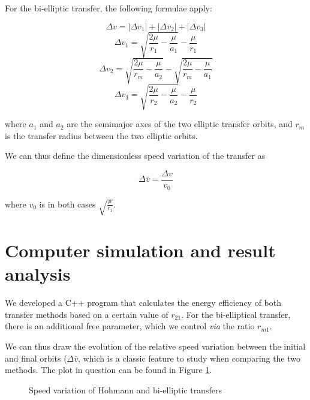 \documentclass[journal]{IEEEtran}
\begin{document}
For the bi-elliptic transfer, the following formulae apply:

\begin{equation}
    \Delta v  = \left|\Delta v_1 \right| + \left| \Delta v_2 \right| + \left| \Delta v_3 \right|
\end{equation}
\begin{equation}
    \Delta v_1 = \sqrt{\frac{2\mu}{r_1}-\frac{\mu}{a_1}}-\frac{\mu}{r_1}
\end{equation}
\begin{equation}
    \Delta v_2 = \sqrt{\frac{2\mu}{r_m}-\frac{\mu}{a_2}} - \sqrt{\frac{2\mu}{r_m}-\frac{\mu}{a_1}}
\end{equation}
\begin{equation}
    \Delta v_3 = \sqrt{\frac{2\mu}{r_2}-\frac{\mu}{a_2}}-\frac{\mu}{r_2}
\end{equation}

where $a_1$ and $a_2$ are the semimajor axes of the two elliptic transfer orbits, and $r_m$ is the transfer radius between the two elliptic orbits.

We can thus define the dimensionless speed variation of the transfer as

\begin{equation}
    \Delta \bar{v} = \frac{\Delta v}{v_0}
\end{equation}

where $v_0$ is in both cases $\sqrt{\frac{\mu}{r_1}}$.

\section*{Computer simulation and result analysis}

We developed a C++ program\cite{git_program} that calculates the energy efficiency of both transfer methods based on a certain value of $r_{21}$. For the bi-elliptical transfer, there is an additional free parameter, which we control \textit{via} the ratio $r_{m1}$.

We can thus draw the evolution of the relative speed variation between the initial and final orbits ($\Delta \bar{v}$, which is a classic feature to study when comparing the two methods. The plot in question can be found in Figure \ref{plot:vbar}.


\begin{figure}[htp!]
  \centering
  
  \caption{Speed variation of Hohmann and bi-elliptic transfers}
  \label{plot:vbar}
\end{figure}
\end{document}
